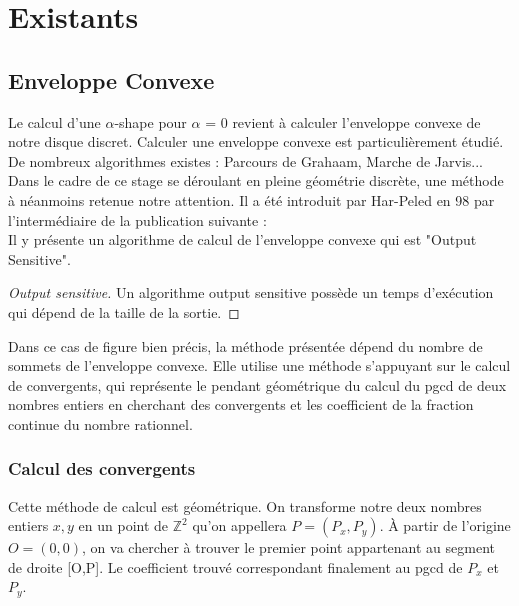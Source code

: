 \section{Existants}

\subsection{Enveloppe Convexe}

Le calcul d'une $\alpha$-shape pour $\alpha$ = 0 revient à calculer l'enveloppe convexe de notre disque discret. Calculer une enveloppe convexe est particulièrement étudié. De nombreux algorithmes existes : Parcours de Grahaam, Marche de Jarvis... Dans le cadre de ce stage se déroulant en pleine géométrie discrète, une méthode à néanmoins retenue notre attention. Il a été introduit par Har-Peled en 98 par l'intermédiaire de la publication suivante : \\

Il y présente un algorithme de calcul de l'enveloppe convexe qui est "Output Sensitive".

\begin{proof}[Output sensitive]
      Un algorithme output sensitive possède un temps d’exécution qui dépend de la taille de la sortie.
\end{proof}

Dans ce cas de figure bien précis, la méthode présentée dépend du nombre de sommets de l'enveloppe convexe. Elle utilise une méthode s'appuyant sur le calcul de convergents, qui représente le pendant géométrique du calcul du pgcd de deux nombres entiers en cherchant des convergents et les coefficient de la fraction continue du nombre rationnel.

\subsubsection{Calcul des convergents}

Cette méthode de calcul est géométrique. On transforme notre deux nombres entiers $x, y$ en un point de $\mathbb{Z}^{2}$ qu'on appellera $P = (P_x, P_y)$. À partir de l’origine $O=(0,0)$, on va chercher à trouver le premier point appartenant au segment de droite [O,P]. Le coefficient trouvé correspondant finalement au pgcd de $P_x$ et $P_y$.\\

